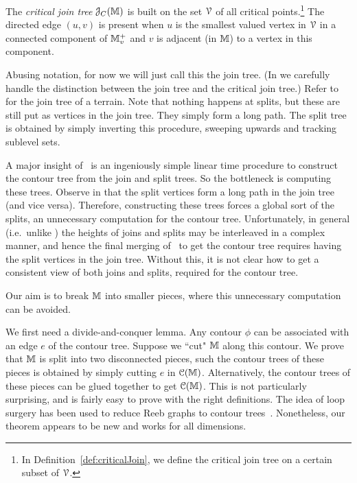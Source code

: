 {\begin{definition} 
\label{def:int-criticalJoin}
The \emph{critical join tree} ${\cal J}_C(\mathbb{M})$ is built on the set ${\cal V}$ of all critical points.\footnote{%
In Definition~\ref{def:criticalJoin}, we define the critical join tree on a certain subset of ${\cal V}$.}
The directed edge $(u,v)$ is present when $u$ is the smallest valued vertex in ${\cal V}$ in a connected component of $\mathbb{M}^+_v$
and $v$ is adjacent (in $\mathbb{M}$) to a vertex in this component. 
\end{definition}

Abusing notation, for now we will just call this the join tree. (In   we carefully handle the distinction 
between the join tree and the critical join tree.)
Refer to  for the join tree of a terrain. Note that nothing happens at splits, but these
are still put as vertices in the join tree. They simply form a long path. The split tree
is obtained by simply inverting this procedure, sweeping upwards and tracking sublevel sets.

A major insight of~\cite{csa-cctad-00} is an ingeniously simple linear time procedure to construct
the contour tree from the join and split trees. So the bottleneck is computing these trees. Observe
in  that the split vertices form a long path in the join tree (and vice versa). Therefore, constructing
these trees forces a global sort of the splits, an unnecessary computation for the contour tree. Unfortunately, in general (i.e.\ unlike ) 
the heights of joins and splits may be interleaved in a complex manner, and hence the final merging of~\cite{csa-cctad-00}
to get the contour tree requires having the split vertices in the join tree. Without
this, it is not clear how to get a consistent view of both joins and splits, required for the contour tree.

Our aim is to break $\mathbb{M}$ into smaller pieces, where this unnecessary computation can be avoided.


 We first need a divide-and-conquer lemma. Any contour $\phi$ can be associated
with an edge $e$ of the contour tree. Suppose we ``cut" $\mathbb{M}$ along this contour. We prove that $\mathbb{M}$
is split into two disconnected pieces, such the contour trees of these pieces is obtained
by simply cutting $e$ in ${\cal C}(\mathbb{M})$. Alternatively, the contour trees of these pieces can
be glued together to get ${\cal C}(\mathbb{M})$. This is not particularly surprising, and is fairly easy to prove
with the right definitions. The idea of loop surgery has been used to reduce Reeb graphs to contour trees~\cite{TiGySi09,DoNa13}.
Nonetheless, our theorem appears to be new and works for all dimensions.


}
